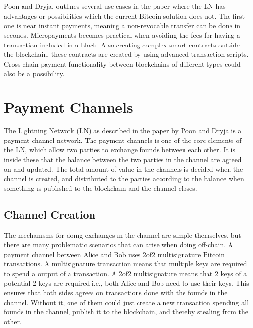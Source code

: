 \documentclass[informationsecurity]{gucmasterproject}
\begin{document}
\paragraph{}
Poon and Dryja. outlines several use cases in the paper \cite{poon2015bitcoin} where the LN has advantages or possibilities which the current Bitcoin solution does not. The first one is near instant payments, meaning a non-revocable transfer can be done in seconds. Micropayments becomes practical when avoiding the fees for having a transaction included in a block. Also creating complex smart contracts outside the blockchain, these contracts are created by using advanced transaction scripts. Cross chain payment functionality between blockchains of different types could also be a possibility.



\chapter{Payment Channels}

The Lightning Network (LN) as described in the paper by Poon and Dryja \cite{poon2015bitcoin} is a payment channel network.
The payment channels is one of the core elements of the LN, which allow two parties to exchange founds between each other.
It is inside these that the balance between the two parties in the channel are agreed on and updated.
The total amount of value in the channels is decided when the channel is created, and distributed to the parties according to the balance when something is published to the blockchain and the channel closes.

\section{Channel Creation}

The mechanisms for doing exchanges in the channel are simple themselves, but there are many problematic scenarios that can arise when doing off-chain.
A payment channel between Alice and Bob uses 2of2 multisignature Bitcoin transactions. A multisignature transaction means that multiple keys are required to spend a output of a transaction. A 2of2 multisignature means that 2 keys of a potential 2 keys are required-i.e., both Alice and Bob need to use their keys. This ensures that both sides agrees on transactions done with the founds in the channel. Without it, one of them could just create a new transaction spending all founds in the channel, publish it to the blockchain, and thereby stealing from the other.
\end{document}

